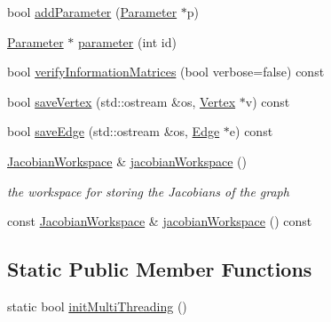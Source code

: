 \begin{DoxyCompactItemize}
\item 
bool \hyperlink{structg2o_1_1OptimizableGraph_ad4a7c038288097b0b1619c609cf40e90}{add\+Parameter} (\hyperlink{classg2o_1_1Parameter}{Parameter} $\ast$p)
\item 
\hyperlink{classg2o_1_1Parameter}{Parameter} $\ast$ \hyperlink{structg2o_1_1OptimizableGraph_ad9506880a9289353ddd2277fafb76ffd}{parameter} (int id)
\item 
bool \hyperlink{structg2o_1_1OptimizableGraph_aae5f20da3c13042a9bc1f491f2150d59}{verify\+Information\+Matrices} (bool verbose=false) const 
\item 
bool \hyperlink{structg2o_1_1OptimizableGraph_a3f254b419e9cc883094d31fdeab76bf7}{save\+Vertex} (std\+::ostream \&os, \hyperlink{classg2o_1_1OptimizableGraph_1_1Vertex}{Vertex} $\ast$v) const 
\item 
bool \hyperlink{structg2o_1_1OptimizableGraph_ad40a71ebbf3d84a327c47b211e8f0911}{save\+Edge} (std\+::ostream \&os, \hyperlink{classg2o_1_1OptimizableGraph_1_1Edge}{Edge} $\ast$e) const 
\item 
\hyperlink{classg2o_1_1JacobianWorkspace}{Jacobian\+Workspace} \& \hyperlink{structg2o_1_1OptimizableGraph_aa669dbd1d6e34e49fecda711ff1b78c6}{jacobian\+Workspace} ()
\begin{DoxyCompactList}\small\item\em the workspace for storing the Jacobians of the graph \end{DoxyCompactList}\item 
const \hyperlink{classg2o_1_1JacobianWorkspace}{Jacobian\+Workspace} \& \hyperlink{structg2o_1_1OptimizableGraph_a2a8f800437cd846bad1df57b0b8c273e}{jacobian\+Workspace} () const 
\end{DoxyCompactItemize}
\subsection*{Static Public Member Functions}
\begin{DoxyCompactItemize}
\item 
static bool \hyperlink{structg2o_1_1OptimizableGraph_ab4ee0fc3ecd31852276ded40b62e9c76}{init\+Multi\+Threading} ()
\end{DoxyCompactItemize}
